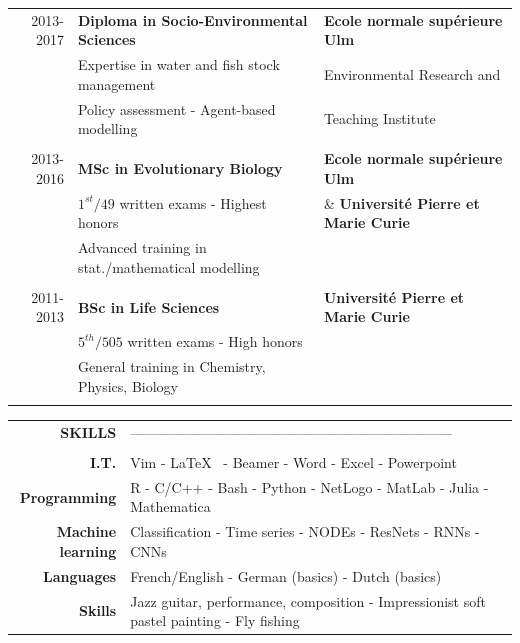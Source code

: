 \documentclass[11pt, oneside]{article}   	%
\begin{document}
\begin{tabular}{rll}
2013-2017 & \textbf{Diploma in Socio-Environmental Sciences} & \textbf{Ecole normale supérieure Ulm} \\
& Expertise in water and fish stock management & Environmental Research and \\
& Policy assessment - Agent-based modelling &  Teaching Institute \\
\\
2013-2016 & \textbf{MSc in Evolutionary Biology} & \textbf{Ecole normale supérieure Ulm} \\
	& $1^{st}/49$ written exams - Highest honors  & \& \textbf{Université Pierre et Marie Curie} \\
 & Advanced training in stat./mathematical modelling & \\
 \\
2011-2013 & \textbf{BSc in Life Sciences} & \textbf{Université Pierre et Marie Curie} \\
 & $5^{th}/505$ written exams - High honors  & \\
& General training in Chemistry, Physics, Biology & \\
\\
\end{tabular}

\hspace{-2.5cm}
\begin{tabular}{rll}
\textbf{SKILLS} & --------------------------------------------------------------------- &  \\
\\
\textbf{I.T.} & Vim - \LaTeX~ - Beamer - Word - Excel - Powerpoint & \\
\textbf{Programming} & R - C/C++ - Bash - Python - NetLogo - MatLab - Julia - Mathematica & \\
\textbf{Machine learning} & Classification - Time series - NODEs - ResNets - RNNs - CNNs & \\
\textbf{Languages} & French/English - German (basics) - Dutch (basics) & \\
\textbf{Skills} & Jazz guitar, performance, composition - Impressionist soft pastel painting - Fly fishing
\end{tabular}
\end{document}
